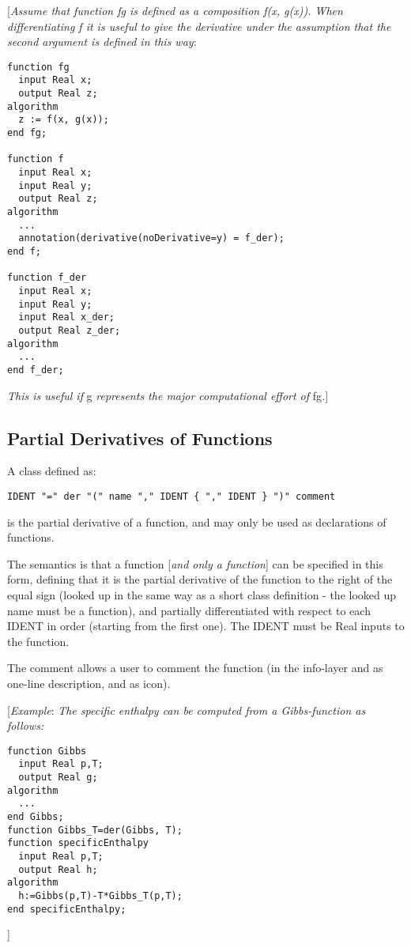 {[}\emph{Assume that function fg is defined as a composition f(x, g(x)).
When differentiating f it is useful to give the derivative under the
assumption that the second argument is defined in this way}:

\begin{lstlisting}[language=modelica]
function fg
  input Real x;
  output Real z;
algorithm
  z := f(x, g(x));
end fg;

function f
  input Real x;
  input Real y;
  output Real z;
algorithm
  ...
  annotation(derivative(noDerivative=y) = f_der);
end f;

function f_der
  input Real x;
  input Real y;
  input Real x_der;
  output Real z_der;
algorithm
  ...
end f_der;
\end{lstlisting}
\emph{This is useful if} g \emph{represents the major computational
effort of} fg\emph{.}{]}

\subsection{Partial Derivatives of Functions}

A class defined as:
\begin{lstlisting}[language=grammar]
IDENT "=" der "(" name "," IDENT { "," IDENT } ")" comment
\end{lstlisting}

is the partial derivative of a function, and may only be used as
declarations of functions.

The semantics is that a function {[}\emph{and only a function}{]} can be
specified in this form, defining that it is the partial derivative of
the function to the right of the equal sign (looked up in the same way
as a short class definition - the looked up name must be a function),
and partially differentiated with respect to each IDENT in order
(starting from the first one). The IDENT must be Real inputs to the
function.

The comment allows a user to comment the function (in the info-layer and
as one-line description, and as icon).

{[}\emph{Example}: \emph{The specific enthalpy can be computed from a
Gibbs-function as follows:}

\begin{lstlisting}[language=modelica]
function Gibbs
  input Real p,T;
  output Real g;
algorithm
  ...
end Gibbs;
function Gibbs_T=der(Gibbs, T);
function specificEnthalpy
  input Real p,T;
  output Real h;
algorithm
  h:=Gibbs(p,T)-T*Gibbs_T(p,T);
end specificEnthalpy;
\end{lstlisting}
{]}

